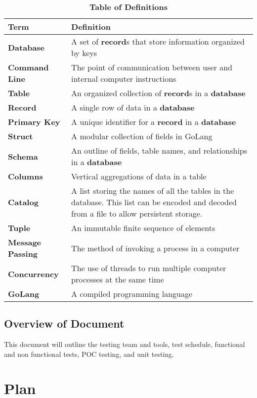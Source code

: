 \documentclass[12pt, titlepage]{article}
\begin{document}
\begin{table}[!htbp]
\caption{\textbf{Table of Definitions}} \label{Table}

\begin{tabularx}{\textwidth}{p{3cm}X}
\toprule
\textbf{Term} & \textbf{Definition}\\
\midrule
\textbf{Database} & A set of \textbf{record}s that store information organized by keys\\
\textbf{Command Line} & The point of communication between user and internal computer instructions\\
\textbf{Table} & An organized collection of \textbf{record}s in a \textbf{database}\\
\textbf{Record} & A single row of data in a \textbf{database}\\
\textbf{Primary Key} & A unique identifier for a \textbf{record} in a \textbf{database}\\
\textbf{Struct} & A modular collection of fields in GoLang \\
\textbf{Schema} & An outline of fields, table names, and relationships in a \textbf{database} \\
\textbf{Columns} & Vertical aggregations of data in a table \\
\textbf{Catalog} & A list storing the names of all the tables in the database. This list can be encoded and decoded from a file to allow persistent storage.\\
\textbf{Tuple} & An immutable finite sequence of elements\\
\textbf{Message Passing} & The method of invoking a process in a computer\\
\textbf{Concurrency} & The use of threads to run multiple computer processes at the same time\\
\textbf{GoLang} & A compiled programming language\\

\bottomrule
\end{tabularx}

\end{table}	

\subsection{Overview of Document}
This document will outline the testing team and tools, test schedule, functional and non functional tests, POC testing, and unit testing.

\section{Plan}
	
\end{document}
